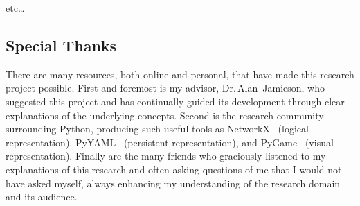 etc\dots


\subsection{Special Thanks}
There are many resources, both online and personal, that have made this research project possible.
First and foremost is my advisor, Dr.\,Alan~Jamieson, who suggested this project
  and has continually guided its development through clear explanations of the underlying concepts.
Second is the research community surrounding Python, producing such useful tools
  as NetworkX~\autocite{hagberg:networkx} (logical representation),
  PyYAML~\autocite{pyyaml} (persistent representation), and
  PyGame~\autocite{pygame} (visual representation).
Finally are the many friends who graciously listened to my explanations of this research
  and often asking questions of me that I would not have asked myself,
  always enhancing my understanding of the research domain and its audience.

